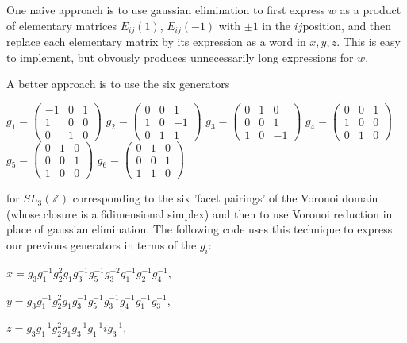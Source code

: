 \documentclass[a4paper,11pt]{report}
\begin{document}
{{{One naive approach is to use gaussian elimination to first express $w$ as a product of elementary matrices $E_{ij}(1)$, $E_{ij}(-1)$ with $\pm 1$ in the $ij$\texttt{}position, and then replace each elementary matrix by its
expression as a word in $x,y,z$. This is easy to implement, but obvously produces unnecessarily long
expressions for $w$. 

 A better approach is to use the six generators 

 $g_1=\left(\begin{array}{rrr} -1 & 0 & 1\\ 1 & 0 & 0\\ 0 & 1 & 0
\end{array}\right) $ $g_2=\left(\begin{array}{rrr} 0 & 0 & 1\\ 1 & 0 & -1\\ 0 & 1 & 1
\end{array}\right) $ $g_3=\left(\begin{array}{rrr} 0 & 1 & 0\\ 0 & 0 & 1\\ 1 & 0 &-1
\end{array}\right) $ $g_4=\left(\begin{array}{rrr} 0 & 0 & 1\\ 1 & 0 & 0\\ 0 & 1 & 0
\end{array}\right) $ $g_5=\left(\begin{array}{rrr} 0 & 1 & 0\\ 0 & 0 & 1\\ 1 & 0 & 0
\end{array}\right) $ $g_6=\left(\begin{array}{rrr} 0 & 1 & 0\\ 0 & 0 & 1\\ 1 & 1 & 0
\end{array}\right) $ 

 for $SL_3(\mathbb Z)$ corresponding to the six 'facet pairings' of the Voronoi domain (whose closure
is a $6$\texttt{}dimensional simplex) and then to use Voronoi reduction in
place of gaussian elimination. The following code uses this technique to
express our previous generators in terms of the $g_i$: 

 $x= g_3g_1^{-1}g_2^2g_1g_3^{-1}g_5^{-1}g_3^{-2}g_1^{-1}g_2^{-1}g_4^{-1}$, 

$y = g_3g_1^{-1}g_2^2g_1g_3^{-1}g_5^{-1}g_3^{-1}g_4^{-1}g_1^{-1}g_3^{-1}$, 

$z= g_3g_1^{-1}g_2^2g_1g_3^{-1}g_1^{-1}ig_3^{-1}$, 

}}}
\end{document}
